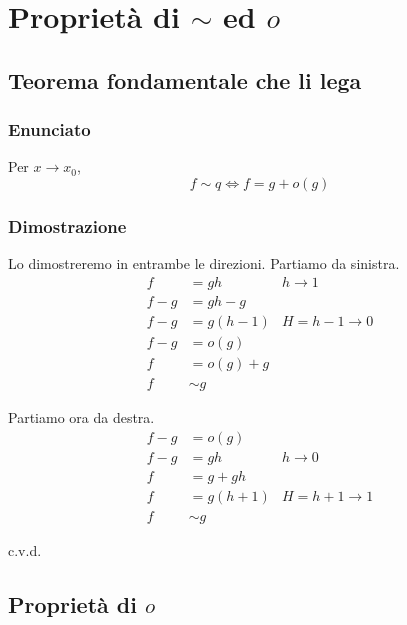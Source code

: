 \documentclass[../../dimostrazioni]{subfiles}
\begin{document}
    \chapter{Proprietà di \texorpdfstring{\(\sim\) ed \(o\)}{asintotico ed o-piccolo}}

        \section*{Teorema fondamentale che li lega}

            \subsection*{Enunciato}

                Per \(x \to x_0\),
                \[
                    f \sim q \iff f = g + o(g)
                \]

            \subsection*{Dimostrazione}

                Lo dimostreremo in entrambe le direzioni. Partiamo da sinistra.
                \begin{align*}
                    f &= gh & h \to 1\\
                    f - g &= gh - g\\
                    f - g &= g (h - 1) & H = h - 1 \to 0\\
                    f - g &= o(g)\\
                    f &= o(g) + g\\
                    f &\sim g
                \end{align*}

                Partiamo ora da destra.
                \begin{align*}
                    f - g &= o(g)\\
                    f - g &= gh & h \to 0\\
                    f &= g + gh\\
                    f &= g (h + 1) & H = h + 1 \to 1\\
                    f &\sim g
                \end{align*}
                
                c.v.d.

        \section*{Proprietà di \(o\)}
\end{document}
